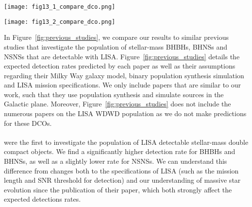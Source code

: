 \begin{figure*}[p]
    \centering
    \texttt{[image: fig13\_1\_compare\_dco.png]}

    \vspace{0.5cm}

    \texttt{[image: fig13\_2\_compare\_dco.png]}
    \caption{A table comparing previous studies of a similar nature to this work. The works listed in the table are \citet{Nelemans+2001}, \citet{Belczynski+2010}, \citet{Liu+2014}, \citet{Lamberts+2018}, \citet{Sesana+2020}, \citet{Lau+2020}, \citet{Breivik+2020} and \citet{Shao+2021}. \href{https://github.com/TomWagg/detecting-DCOs-in-LISA/blob/main/paper/figures/fig13_1_compare_dco.png}{\faFileImage} \href{https://github.com/TomWagg/detecting-DCOs-in-LISA/blob/main/paper/figures/fig13_2_compare_dco.png}{\faFileImage}.}
    \label{fig:previous_studies}
\end{figure*}

In Figure~\ref{fig:previous_studies}, we compare our results to similar previous studies that investigate the population of stellar-mass BHBHs, BHNSs and NSNSs that are detectable with LISA. Figure~\ref{fig:previous_studies} details the expected detection rates predicted by each paper as well as their assumptions regarding their Milky Way galaxy model, binary population synthesis simulation and LISA mission specifications. We only include papers that are similar to our work, such that they use population synthesis and simulate sources in the Galactic plane. Moreover, Figure~\ref{fig:previous_studies} does not include the numerous papers on the LISA WDWD population as we do not make predictions for these DCOs.
 
\paragraph{\citet{Nelemans+2001}} were the first to investigate the population of LISA detectable stellar-mass double compact objects. We find a significantly higher detection rate for BHBHs and BHNSs, as well as a slightly lower rate for NSNSs. We can understand this difference from changes both to the specifications of LISA (such as the mission length and SNR threshold for detection) and our understanding of massive star evolution since the publication of their paper, which both strongly affect the expected detections rates.

